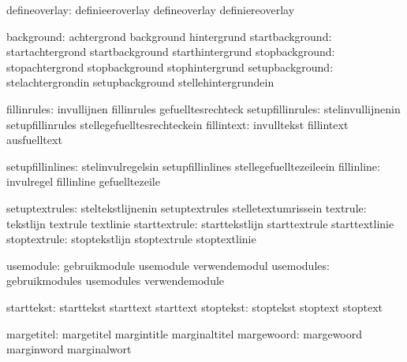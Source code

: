                 defineoverlay:  definieeroverlay             defineoverlay
                                definiereoverlay

                   background:  achtergrond                  background
                                hintergrund
              startbackground:  startachtergrond             startbackground
                                starthintergrund
               stopbackground:  stopachtergrond              stopbackground
                                stophintergrund
              setupbackground:  stelachtergrondin            setupbackground
                                stellehintergrundein

                  fillinrules:  invullijnen                  fillinrules
                                gefuelltesrechteck
             setupfillinrules:  stelinvullijnenin            setupfillinrules
                                stellegefuelltesrechteckein
                   fillintext:  invulltekst                  fillintext
                                ausfuelltext

             setupfillinlines:  stelinvulregelsin            setupfillinlines
                                stellegefuelltezeileein
                   fillinline:  invulregel                   fillinline
                                gefuelltezeile

               setuptextrules:  steltekstlijnenin            setuptextrules
                                stelletextumrissein
                     textrule:  tekstlijn                    textrule
                                textlinie
                starttextrule:  starttekstlijn               starttextrule
                                starttextlinie
                 stoptextrule:  stoptekstlijn                stoptextrule
                                stoptextlinie

                    usemodule:  gebruikmodule                usemodule
                                verwendemodul
                   usemodules:  gebruikmodules               usemodules
                                verwendemodule

                   starttekst:  starttekst                   starttext
                                starttext
                    stoptekst:  stoptekst                    stoptext
                                stoptext

                   margetitel:  margetitel                   margintitle
                                marginaltitel
                   margewoord:  margewoord                   marginword
                                marginalwort

